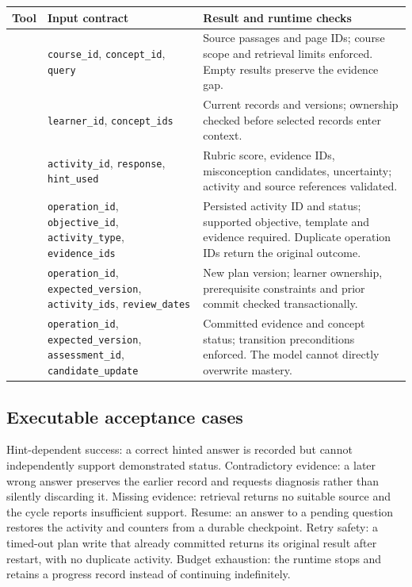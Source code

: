 \documentclass{article}
\begin{document}
{\small
\begin{longtable}{@{}>{\raggedright\arraybackslash}p{1.13in}>{\raggedright\arraybackslash}p{1.43in}>{\raggedright\arraybackslash}p{2.59in}@{}}
\toprule
\textbf{Tool} & \textbf{Input contract} & \textbf{Result and runtime checks} \\
\midrule
\endhead
{\footnotesize \texttt{retrieve\_evidence}} & {\footnotesize \texttt{course\_id}, \texttt{concept\_id}, \texttt{query}} & Source passages and page IDs; course scope and retrieval limits enforced. Empty results preserve the evidence gap. \\
\addlinespace[3pt]
{\footnotesize \texttt{load\_learner\_state}} & {\footnotesize \texttt{learner\_id}, \texttt{concept\_ids}} & Current records and versions; ownership checked before selected records enter context. \\
\addlinespace[3pt]
{\footnotesize \texttt{assess\_response}} & {\footnotesize \texttt{activity\_id}, \texttt{response}, \texttt{hint\_used}} & Rubric score, evidence IDs, misconception candidates, uncertainty; activity and source references validated. \\
\addlinespace[3pt]
{\footnotesize \texttt{assign\_activity}} & {\footnotesize \texttt{operation\_id}, \texttt{objective\_id}, \texttt{activity\_type}, \texttt{evidence\_ids}} & Persisted activity ID and status; supported objective, template and evidence required. Duplicate operation IDs return the original outcome. \\
\addlinespace[3pt]
{\footnotesize \texttt{revise\_plan}} & {\footnotesize \texttt{operation\_id}, \texttt{expected\_version}, \texttt{activity\_ids}, \texttt{review\_dates}} & New plan version; learner ownership, prerequisite constraints and prior commit checked transactionally. \\
\addlinespace[3pt]
{\footnotesize \texttt{record\_assessment}} & {\footnotesize \texttt{operation\_id}, \texttt{expected\_version}, \texttt{assessment\_id}, \texttt{candidate\_update}} & Committed evidence and concept status; transition preconditions enforced. The model cannot directly overwrite mastery. \\
\bottomrule
\end{longtable}
}

\subsection{Executable acceptance cases}

Hint-dependent success: a correct hinted answer is recorded but cannot independently support demonstrated status. Contradictory evidence: a later wrong answer preserves the earlier record and requests diagnosis rather than silently discarding it. Missing evidence: retrieval returns no suitable source and the cycle reports insufficient support. Resume: an answer to a pending question restores the activity and counters from a durable checkpoint. Retry safety: a timed-out plan write that already committed returns its original result after restart, with no duplicate activity. Budget exhaustion: the runtime stops and retains a progress record instead of continuing indefinitely.
\end{document}
